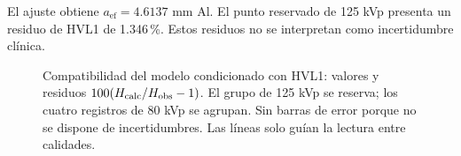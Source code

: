 El ajuste obtiene $a_{\mathrm{ef}}=\num{4.6137}$ mm Al. El punto reservado de 125 kVp presenta un residuo de HVL1 de \num{1.346}\,\%. Estos residuos no se interpretan como incertidumbre clínica.
\begin{table}[htbp]\centering\small\caption{Ajuste condicionado de HVL1 (mm Al) y cambio del factor combinado a 10 cm de lado.}\end{table}
\begin{figure}[p]\centering
\caption{Compatibilidad del modelo condicionado con HVL1: valores y residuos $100(H_{\rm calc}/H_{\rm obs}-1)$. El grupo de 125 kVp se reserva; los cuatro registros de 80 kVp se agrupan. Sin barras de error porque no se dispone de incertidumbres. Las líneas solo guían la lectura entre calidades.}\label{fig:ajuste_hvl}\end{figure}
